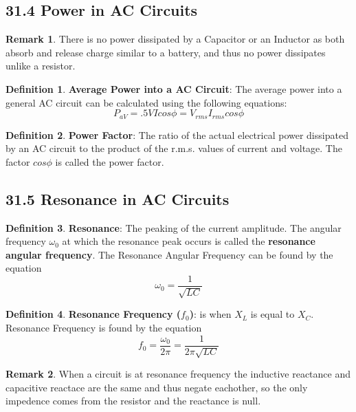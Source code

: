 \documentclass[12pt]{amsart}
\theoremstyle{definition}
\newtheorem{definition}{Definition} %
\newtheorem*{remark}{Remark}        %
\numberwithin{equation}{theorem}    %
\begin{document}
\subsection*{31.4 Power in AC Circuits}

\begin{remark}
    There is no power dissipated by a Capacitor or an Inductor as both absorb and release charge similar to a battery, and thus no power dissipates unlike a resistor.
\end{remark}

\begin{definition}
    \textbf{Average Power into a AC Circuit}:
    The average power into a general AC circuit can be calculated using the following equations:
    $$P_{aV} = .5VIcos\phi = V_{rms}I_{rms}cos\phi$$
\end{definition}

\begin{definition}
    \textbf{Power Factor}:
    The ratio of the actual electrical power dissipated by an AC circuit to the product of the r.m.s. values of current and voltage. The factor $cos\phi$ is called the power factor. 
\end{definition}

\subsection*{31.5 Resonance in AC Circuits}

\begin{definition}
    \textbf{Resonance}:
    The peaking of the current amplitude. The angular frequency $\omega_0$ at which the resonance peak occurs is called the \textbf{resonance angular frequency}. The Resonance Angular Frequency can be found by the equation $$\omega_0 = \frac{1}{\sqrt{LC}}$$
\end{definition}

\begin{definition}
    \textbf{Resonance Frequency ($f_0$)}:
     is when $X_L$ is equal to $X_C$. Resonance Frequency is found by the equation 
     $$f_0 = \frac{\omega_0}{2\pi} = \frac{1}{2\pi \sqrt{LC}}$$

     \begin{remark}
         When a circuit is at resonance frequency the inductive reactance and capacitive reactace are the same and thus negate eachother, so the only impedence comes from the resistor and the reactance is null.
     \end{remark}
\end{definition}
\end{document}
